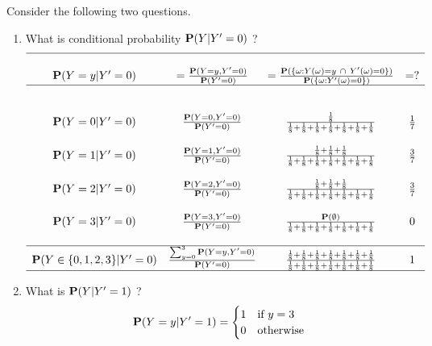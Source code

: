  \begin{classwork}
 Consider the following two questions.
 \begin{enumerate}
\item What is conditional probability $\mathbf{P}(Y|Y'=0)$ ?
 \[
 \begin{array}{c c c c}
 \hline \\
 \mathbf{P}(Y=y | Y'=0) & =\frac{\mathbf{P}(Y=y,Y'=0)}{\mathbf{P}(Y'=0)} & =\frac{\mathbf{P}(\{\omega: Y(\omega)=y \  \cap \ Y'(\omega)=0\})}{\mathbf{P}(\{\omega: Y'(\omega)=0\})} & = ? \\ \hline \\
 \\
 \mathbf{P}(Y=0 | Y'=0) & \frac{\mathbf{P}(Y=0,Y'=0)}{\mathbf{P}(Y'=0)} & \frac{\frac{1}{8}}{\frac{1}{8}+\frac{1}{8}+\frac{1}{8}+\frac{1}{8}+\frac{1}{8}+\frac{1}{8}+\frac{1}{8}} & \frac{1}{7} \\
\\
\mathbf{P}(Y=1 | Y'=0) & \frac{\mathbf{P}(Y=1,Y'=0)}{\mathbf{P}(Y'=0)} & \frac{\frac{1}{8}+\frac{1}{8}+\frac{1}{8}}{\frac{1}{8}+\frac{1}{8}+\frac{1}{8}+\frac{1}{8}+\frac{1}{8}+\frac{1}{8}+\frac{1}{8}} & \frac{3}{7} \\
\\
\mathbf{P}(Y=2 | Y'=0) & \frac{\mathbf{P}(Y=2,Y'=0)}{\mathbf{P}(Y'=0)} & \frac{\frac{1}{8}+\frac{1}{8}+\frac{1}{8}}{\frac{1}{8}+\frac{1}{8}+\frac{1}{8}+\frac{1}{8}+\frac{1}{8}+\frac{1}{8}+\frac{1}{8}} & \frac{3}{7} \\
\\
\mathbf{P}(Y=3 | Y'=0) & \frac{\mathbf{P}(Y=3,Y'=0)}{\mathbf{P}(Y'=0)} & \frac{\mathbf{P}(\emptyset)}{\frac{1}{8}+\frac{1}{8}+\frac{1}{8}+\frac{1}{8}+\frac{1}{8}+\frac{1}{8}+\frac{1}{8}} & 0 \\
\\ \hline
\mathbf{P}(Y \in \{0,1,2,3\} | Y'=0) & \frac{\sum_{y=0}^3{\mathbf{P}(Y=y,Y'=0)}}{\mathbf{P}(Y'=0)} & \frac {\frac{1}{8}+\frac{1}{8}+\frac{1}{8}+\frac{1}{8}+\frac{1}{8}+\frac{1}{8}+\frac{1}{8}}{\frac{1}{8}+\frac{1}{8}+\frac{1}{8}+\frac{1}{8}+\frac{1}{8}+\frac{1}{8}+\frac{1}{8}} & 1 \\ \hline
 \end{array}
 \]
\item What is $\mathbf{P}(Y|Y'=1)$ ?
 \[
\mathbf{P}(Y=y | Y'=1) = 
\begin{cases}
1 & \text{if $y=3$} \\
0 & \text{otherwise}
 \end{cases}
 \]
 \end{enumerate}
 \end{classwork}

